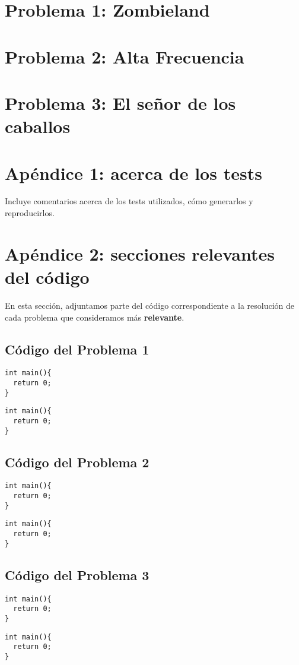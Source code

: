 \documentclass[a4paper]{article}
\begin{document}
\newpage
\section{Problema 1: Zombieland}


\newpage
\section{Problema 2: Alta Frecuencia}


\newpage
\section{Problema 3: El señor de los caballos}



\newpage
\section{Apéndice 1: acerca de los tests}

Incluye comentarios acerca de los tests utilizados, cómo generarlos y reproducirlos.


\newpage
\section{Apéndice 2: secciones relevantes del código}
En esta sección, adjuntamos parte del código correspondiente a la resolución de cada problema
que consideramos más \textbf{relevante}.

\subsection{Código del Problema 1}

\begin{lstlisting}
int main(){
  return 0;
}
\end{lstlisting}

\vspace*{0.5cm}

\begin{lstlisting}
int main(){
  return 0;
}
\end{lstlisting}

\newpage
\subsection{Código del Problema 2}

\begin{lstlisting}
int main(){
  return 0;
}
\end{lstlisting}

\vspace*{0.5cm}

\begin{lstlisting}
int main(){
  return 0;
}
\end{lstlisting}


\newpage
\subsection{Código del Problema 3}

\begin{lstlisting}
int main(){
  return 0;
}
\end{lstlisting}

\vspace*{0.5cm}

\begin{lstlisting}
int main(){
  return 0;
}
\end{lstlisting}
\end{document}
